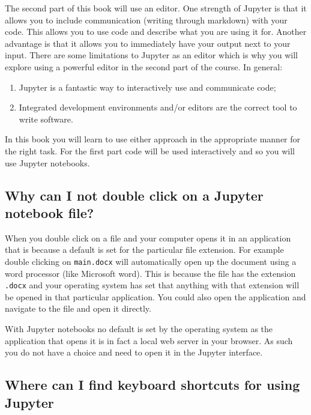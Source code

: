 The second part of this book will use an editor.
One strength of Jupyter is that it allows you to include communication (writing
through markdown) with your code. This allows you to use code and describe what
you are using it for.
Another advantage is that it allows you to immediately have your output next to your input.
There are some limitations to Jupyter as an editor which is why you will explore
using a powerful editor in the second part of the course.
In general:

\begin{enumerate}

\item 

Jupyter is a fantastic way to interactively use and communicate code;

\item 

Integrated development environments and/or editors are the correct tool to
write software.

\end{enumerate}


In this book you will learn to use either approach in the appropriate manner
for the right task. For the first part code will be used interactively and so
you will use Jupyter notebooks.

\subsection{Why can I not double click on a Jupyter notebook file?}

When you double click on a file and your computer opens it in an application
that is because a default is set for the particular file extension. For example
double clicking on \texttt{main.docx} will automatically open up the document using a
word processor (like Microsoft word). This is because the file has the extension
\texttt{.docx} and your operating system has set that anything with that extension will
be opened in that particular application. You could also open the
application and navigate to the file and open it directly.

With Jupyter notebooks no default is set by the operating system as the
application that opens it is in fact a local web server in your browser. As such
you do not have a choice and need to open it in the Jupyter interface.


\subsection{Where can I find keyboard shortcuts for using Jupyter}

